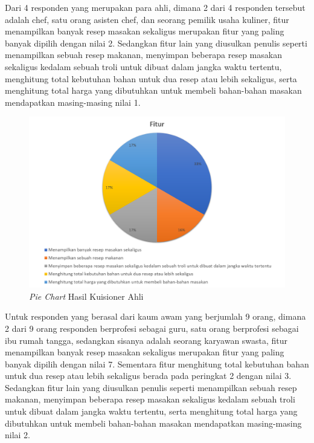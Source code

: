 	Dari 4 responden yang merupakan para ahli, dimana 2 dari 4 responden tersebut adalah chef, satu orang asisten chef, dan seorang pemilik usaha kuliner, fitur menampilkan banyak resep masakan sekaligus merupakan fitur yang paling banyak dipilih dengan nilai 2. Sedangkan fitur lain yang diusulkan penulis seperti menampilkan sebuah resep makanan, menyimpan beberapa resep masakan sekaligus kedalam sebuah troli untuk dibuat dalam jangka waktu tertentu, menghitung total kebutuhan bahan untuk dua resep atau lebih sekaligus, serta menghitung total harga yang dibutuhkan untuk membeli bahan-bahan masakan mendapatkan masing-masing nilai 1.
	
	\begin{figure}[H]
		\centering
		\includegraphics[width=1\textwidth]{gambar/pie/kuisioner_ahli}
		\caption{\textit{Pie Chart} Hasil Kuisioner Ahli}
	\end{figure}
	
	Untuk responden yang berasal dari kaum awam yang berjumlah 9 orang, dimana 2 dari 9 orang responden berprofesi sebagai guru, satu orang berprofesi sebagai ibu rumah tangga, sedangkan sisanya adalah seorang karyawan swasta, fitur menampilkan banyak resep masakan sekaligus merupakan fitur yang paling banyak dipilih dengan nilai 7. Sementara fitur menghitung total kebutuhan bahan untuk dua resep atau lebih sekaligus berada pada peringkat 2 dengan nilai 3. Sedangkan fitur lain yang diusulkan penulis seperti menampilkan sebuah resep makanan, menyimpan beberapa resep masakan sekaligus kedalam sebuah troli untuk dibuat dalam jangka waktu tertentu, serta menghitung total harga yang dibutuhkan untuk membeli bahan-bahan masakan mendapatkan masing-masing nilai 2.
	
